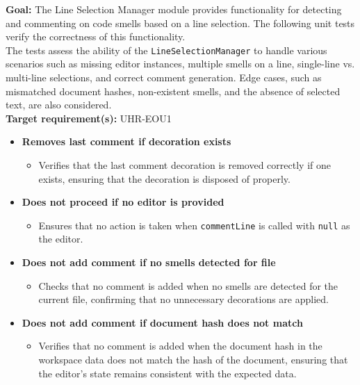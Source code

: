 \documentclass[12pt, titlepage]{article}
\begin{document}
\begin{enumerate}[label={\bf \textcolor{Maroon}{test-SRT-\arabic*}}, wide=0pt, font=\itshape]
\textbf{Goal:} The Line Selection Manager module provides functionality for detecting and commenting on code smells based on a line selection. The following unit tests verify the correctness of this functionality.\\

\noindent The tests assess the ability of the \texttt{LineSelectionManager} to handle various scenarios such as missing editor instances, multiple smells on a line, single-line vs. multi-line selections, and correct comment generation. Edge cases, such as mismatched document hashes, non-existent smells, and the absence of selected text, are also considered.\\

\noindent \textbf{Target requirement(s):} UHR-EOU1~\cite{SRS} \\

\begin{itemize}
    \item \textbf{Removes last comment if decoration exists}
    \begin{itemize}
        \item Verifies that the last comment decoration is removed correctly if one exists, ensuring that the decoration is disposed of properly.
    \end{itemize}

    \item \textbf{Does not proceed if no editor is provided}
    \begin{itemize}
        \item Ensures that no action is taken when \texttt{commentLine} is called with \texttt{null} as the editor.
    \end{itemize}

    \item \textbf{Does not add comment if no smells detected for file}
    \begin{itemize}
        \item Checks that no comment is added when no smells are detected for the current file, confirming that no unnecessary decorations are applied.
    \end{itemize}

    \item \textbf{Does not add comment if document hash does not match}
    \begin{itemize}
        \item Verifies that no comment is added when the document hash in the workspace data does not match the hash of the document, ensuring that the editor's state remains consistent with the expected data.
    \end{itemize}


\end{itemize}
\end{enumerate}
\end{document}
